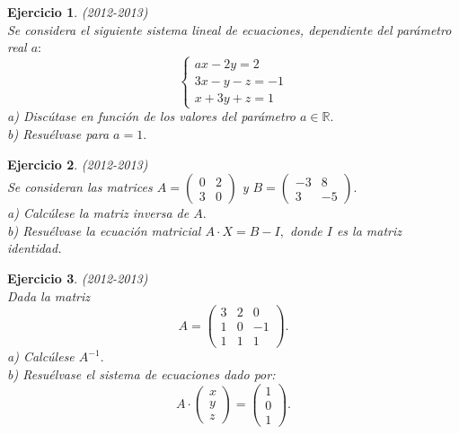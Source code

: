 \documentclass[12pt, a4paper]{amsart}
\newtheorem{ejer}{Ejercicio}
\begin{document}
\begin{ejer}\em (2012-2013)\\
Se considera el siguiente sistema lineal de ecuaciones, dependiente del parámetro real $a:$
\begin{equation*}
\left \{ \begin{matrix} ax-2y=2
\\ 3x-y-z=-1
\\ x+3y+z=1 \end{matrix}\right. 
\end{equation*}
a) Discútase en función de los valores del parámetro $a\in\mathbb{R}.$\\
b) Resuélvase para $a=1.$
\end{ejer}

\begin{ejer}\em (2012-2013)\\
Se consideran las matrices $A=\begin{pmatrix}
0 & 2
\\ 3 & 0 \end{pmatrix}$ y $B=\begin{pmatrix}
-3 & 8
\\ 3 & -5 \end{pmatrix}.$\\
a) Calcúlese la matriz inversa de $A.$\\
b) Resuélvase la ecuación matricial $A\cdot X=B-I,$ donde $I$ es la matriz identidad.
\end{ejer}


\begin{ejer}\em (2012-2013)\\
Dada la matriz \begin{equation*}
A=\begin{pmatrix}
3 & 2 & 0
\\ 1 & 0 & -1
\\ 1 & 1 & 1
\end{pmatrix}.
\end{equation*}
a) Calcúlese $A^{-1}.$\\
b) Resuélvase el sistema de ecuaciones dado por: \begin{equation*}
A\cdot \begin{pmatrix}
x\\ y\\ z
\end{pmatrix}= \begin{pmatrix}
1\\ 0\\ 1
\end{pmatrix}.
\end{equation*}
\end{ejer}
\end{document}
